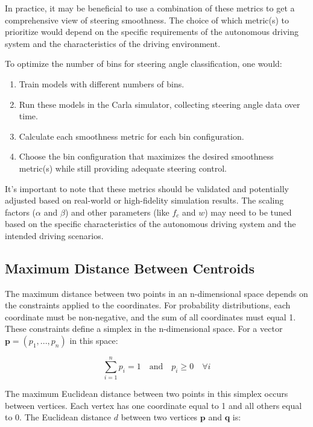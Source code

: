 In practice, it may be beneficial to use a combination of these metrics to get a comprehensive view of steering smoothness. The choice of which metric(s) to prioritize would depend on the specific requirements of the autonomous driving system and the characteristics of the driving environment.

To optimize the number of bins for steering angle classification, one would:

\begin{enumerate}
    \item Train models with different numbers of bins.
    \item Run these models in the Carla simulator, collecting steering angle data over time.
    \item Calculate each smoothness metric for each bin configuration.
    \item Choose the bin configuration that maximizes the desired smoothness metric(s) while still providing adequate steering control.
\end{enumerate}

It's important to note that these metrics should be validated and potentially adjusted based on real-world or high-fidelity simulation results. The scaling factors ($\alpha$ and $\beta$) and other parameters (like $f_c$ and $w$) may need to be tuned based on the specific characteristics of the autonomous driving system and the intended driving scenarios.

\subsection{Maximum Distance Between Centroids}

The maximum distance between two points in an n-dimensional space depends on the constraints applied to the coordinates. For probability distributions, each coordinate must be non-negative, and the sum of all coordinates must equal 1. These constraints define a simplex in the n-dimensional space. For a vector $\mathbf{p} = (p_1, ..., p_n)$ in this space:

\begin{equation}
\sum_{i=1}^n p_i = 1 \quad \text{and} \quad p_i \geq 0 \quad \forall i
\end{equation}

The maximum Euclidean distance between two points in this simplex occurs between vertices. Each vertex has one coordinate equal to 1 and all others equal to 0. The Euclidean distance $d$ between two vertices $\mathbf{p}$ and $\mathbf{q}$ is:

